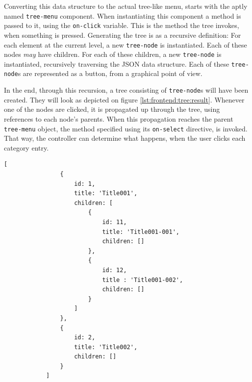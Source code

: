 		Converting this data structure to the actual tree-like menu, starts with the aptly named \verb=tree-menu= component. When instantiating this component a method is passed to it, using the \verb=on-click= variable. This is the method the tree invokes, when something is pressed. Generating the tree is as a recursive definition: For each element at the current level, a new \verb=tree-node= is instantiated. Each of these nodes \emph{may} have children. For each of these children, a new \verb=tree-node= is instantiated, recursively traversing the JSON data structure.	Each of these \verb=tree-node=s are represented as a button, from a graphical point of view.

		In the end, through this recursion, a tree consisting of \verb=tree-node=s will have been created. They will look as depicted on figure \ref{lst:frontend:tree:result}. Whenever one of the nodes are clicked, it is propagated up through the tree, using references to each node's parents. When this propagation reaches the parent \verb=tree-menu= object, the method specified using its \verb=on-select= directive, is invoked. That way, the controller can determine what happens, when the user clicks each category entry.

		\pagebreak

		\begin{lstlisting}[style=json2,gobble=12, caption={The front-end's category tree data structure},label={lst:frontend:tree:data}]
            [
                {
                    id: 1,
                    title: 'Title001',
                    children: [
                        {
                            id: 11,
                            title: 'Title001-001',
                            children: []
                        },
                        {
                            id: 12,
                            title : 'Title001-002',
                            children: []
                        }
                    ]
                },
                {
                    id: 2,
                    title: 'Title002',
                    children: []
                }
            ]
		\end{lstlisting}
	
